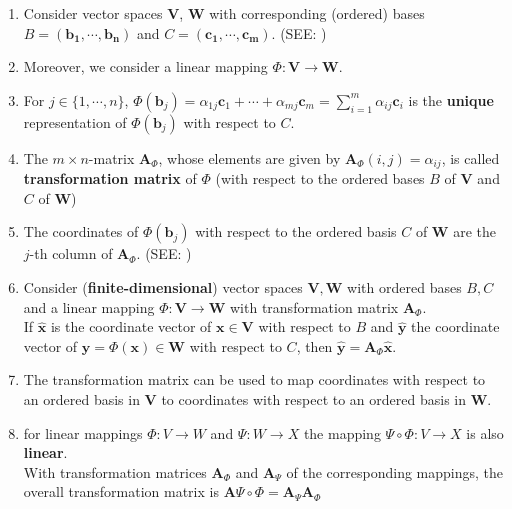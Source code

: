 \begin{enumerate}
    \item Consider vector spaces $\mathbf{V}$, $\mathbf{W}$ with corresponding (ordered) bases $\mathit{B} = \mathbf{(b_1, \cdots , b_n)}$ and $\mathit{C} = \mathbf{(c_1, \cdots , c_m)}$. (SEE: )

    \item Moreover, we consider a linear mapping $\Phi : \mathbf{V} \to \mathbf{W}$. 

    \item For $j \in \{1, \cdots , n\}$, \(     \displaystyle \Phi(\mathbf{b}_j) = \alpha_{1j}\mathbf{c}_1 + \cdots + \alpha_{mj}\mathbf{c}_m = \sum_{i=1}^{m} \alpha_{ij}\mathbf{c}_{i} \) is the \textbf{unique} representation of $\Phi(\mathbf{b}_j)$ with respect to $\mathit{C}$. 

    \item The $m \times n$-matrix $\mathbf{A}_\Phi$, whose elements are given by \( \mathbf{A}_\Phi(i, j) = \alpha_{ij} \), is called \textbf{transformation matrix} of $\Phi$ (with respect to the ordered bases $\mathit{B}$ of $\mathbf{V}$ and $\mathit{C}$ of $\mathbf{W}$)

    \item The coordinates of $\Phi(\mathbf{b}_j)$ with respect to the ordered basis $\mathit{C}$ of $\mathbf{W}$ are the $j$-th column of $\mathbf{A}_\Phi$. (SEE: )

    \item Consider (\textbf{finite-dimensional}) vector spaces $\mathbf{V, W}$ with ordered bases $\mathit{B, C}$ and a linear mapping $\Phi : \mathbf{V \to W}$ with transformation matrix $\mathbf{A}_\Phi$. \\
    If $\hat{\mathbf{x}}$ is the coordinate vector of $\mathbf{x} \in \mathbf{V}$ with respect to $\mathit{B}$ and $\hat{\mathbf{y}}$ the coordinate vector of $\mathbf{y} = \Phi(\mathbf{x}) \in \mathbf{W}$ with respect to $\mathit{C}$, then $\hat{\mathbf{y}} = \mathbf{A}_\Phi\hat{\mathbf{x}}$.

    \item The transformation matrix can be used to map coordinates with respect to an ordered basis in $\mathbf{V}$ to coordinates with respect to an ordered basis in $\mathbf{W}$.

    \item for linear mappings $\Phi : V \to W$ and $\Psi : W \to X$ the mapping $\Psi \circ \Phi : V \to X$ is also \textbf{linear}.\\
    With transformation matrices $\mathbf{A}_\Phi$ and $\mathbf{A}_\Psi$ of the corresponding mappings, the overall transformation matrix is $\mathbf{A}\Psi\circ\Phi = \mathbf{A}_\Psi \mathbf{A}_\Phi$


\end{enumerate}
